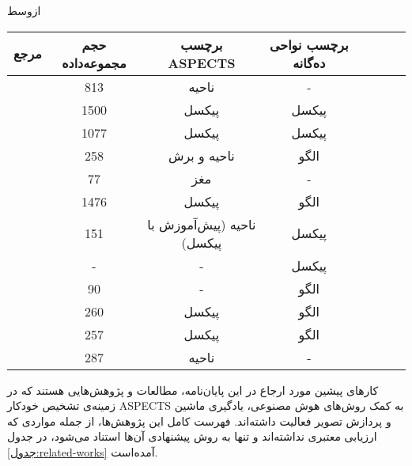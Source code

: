 \vspace{1.5em}

‌ازوسط

\begin{tabular}{rccccccc}
    \hline
    مرجع                                    & حجم مجموعه‌داده            & برچسب ASPECTS           &  برچسب نواحی ده‌گانه \\ \hline
    \cite{lee2023clinical}                  & 813                        & ناحیه                    & - \\ 
    \cite{upadhyay2022deep}                 & 1500                       & پیکسل                    & پیکسل \\
    \cite{cao2022deep}                      & 1077                       & پیکسل                    & پیکسل \\ 
    \cite{chiang2022deep}                   & 258                        & ناحیه و برش              & الگو \\ 
    \cite{golkonda2022automated}            & 77                         & مغز                      & - \\
    \cite{chen2022improving}                & 1476                       & پیکسل                    & الگو \\
    \cite{naganuma2021alberta}              & 151                        & ناحیه (پیش‌آموزش با پیکسل) & پیکسل \\
    \cite{liu2021deep}                      & -                          & -                        & پیکسل \\
    \cite{yu2021automated}                  & 90                         & -                        & الگو \\   
    \cite{kuang2021eis}                     & 260                        & پیکسل                    & الگو \\
    \cite{kuang2019automated}               & 257                        & پیکسل                    & الگو \\
    \cite{jung2018evaluating}               & 287                        & ناحیه                    & - \\ \hline
\end{tabular}



کار‌های پیشین مورد ارجاع در این پایان‌نامه، مطالعات و پژوهش‌هایی هستند که 
در زمینه‌ی تشخیص خودکار ASPECTS به کمک روش‌های هوش مصنوعی، یادگیری ماشین و پردازش تصویر فعالیت داشته‌اند.
فهرست کامل این پژوهش‌ها، از جمله مواردی که ارزیابی معتبری نداشته‌اند و تنها به روش پیشنهادی آن‌ها استناد می‌شود، در جدول 
\ref{جدول:related-works}
آمده‌است.

